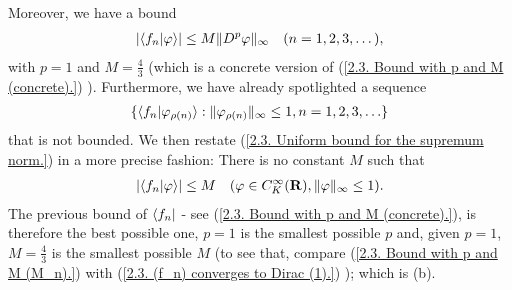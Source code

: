 Moreover, we have a bound %
%
  \begin{align}
    \lvert \bra{f_n}\ket{\varphi} \rvert \leq M \| D^p \varphi \|_\infty 
    \quad (n=1, 2, 3, \dots), 
  \end{align}
%
with $p=1$ and $M= \frac{4}{3}$ (which is a concrete version of %
%
  (\ref{2.3. Bound with p and M (concrete).})%
%
). Furthermore, we have already spotlighted a sequence %
%
  \begin{align}
    \set{
      \langle{f_n} \lvert \phi_{\rho(n)} \rangle
    }{
      \| \phi_{\rho(n)} \|_\infty \leq 1, \counting{n}
    }
  \end{align}
%
that is not bounded. We then restate  %
%
  (\ref{2.3. Uniform bound for the supremum norm.}) %
%
in a more precise fashion: %
There is no constant $M$ such that %
%
  \begin{align}
    \lvert \langle f_n \lvert \varphi \rangle \rvert \leq M 
    \quad (\varphi\in C_K^\infty({\mathbf R}), \| \varphi \|_\infty \leq 1).
  \end{align}
%
The previous bound of $\bra{f_n}$ %
%
  - see (\ref{2.3. Bound with p and M (concrete).}), 
%
is therefore the best possible one, \ie %
% 
    $p=1$ is the smallest possible $p$ and, given $p=1$,  %
    $M=\frac{4}{3}$ is the smallest possible $M$ %
    (to see that, compare %
      (\ref{2.3. Bound with p and M (M_n).}) with 
      (\ref{2.3. (f_n) converges to Dirac (1).})%
    ); which is (b). %
%
\newline\newline\noindent
%

